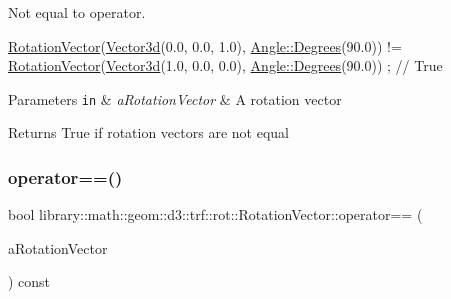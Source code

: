 Not equal to operator. 


\begin{DoxyCode}
\hyperlink{classlibrary_1_1math_1_1geom_1_1d3_1_1trf_1_1rot_1_1_rotation_vector_a49076a279f457fdb14c4a9d4d61e1738}{RotationVector}(\hyperlink{namespacelibrary_1_1math_1_1obj_a977e84e9bf317a4e7dd9d6d671d6da2f}{Vector3d}(0.0, 0.0, 1.0), \hyperlink{classlibrary_1_1math_1_1geom_1_1_angle_a64aa53e8420aeb6f671d86c65c370bc8}{Angle::Degrees}(90.0)) != 
      \hyperlink{classlibrary_1_1math_1_1geom_1_1d3_1_1trf_1_1rot_1_1_rotation_vector_a49076a279f457fdb14c4a9d4d61e1738}{RotationVector}(\hyperlink{namespacelibrary_1_1math_1_1obj_a977e84e9bf317a4e7dd9d6d671d6da2f}{Vector3d}(1.0, 0.0, 0.0), \hyperlink{classlibrary_1_1math_1_1geom_1_1_angle_a64aa53e8420aeb6f671d86c65c370bc8}{Angle::Degrees}(90.0)) ; \textcolor{comment}{// True}
\end{DoxyCode}



\begin{DoxyParams}[1]{Parameters}
\mbox{\tt in}  & {\em a\+Rotation\+Vector} & A rotation vector \\
\hline
\end{DoxyParams}
\begin{DoxyReturn}{Returns}
True if rotation vectors are not equal 
\end{DoxyReturn}
\mbox{\label{classlibrary_1_1math_1_1geom_1_1d3_1_1trf_1_1rot_1_1_rotation_vector_a3e56f843ce247d75d93a99defa47b386}} 
\subsubsection{\texorpdfstring{operator==()}{operator==()}}
{\footnotesize\ttfamily bool library\+::math\+::geom\+::d3\+::trf\+::rot\+::\+Rotation\+Vector\+::operator== (\begin{DoxyParamCaption}\item[{const \hyperlink{classlibrary_1_1math_1_1geom_1_1d3_1_1trf_1_1rot_1_1_rotation_vector}{Rotation\+Vector} \&}]{a\+Rotation\+Vector }\end{DoxyParamCaption}) const}



